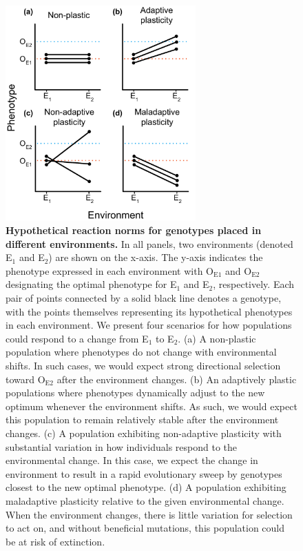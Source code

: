 \begin{figure}[ht!]
    \centering
    \includegraphics[width=0.65\textwidth]{media/reaction-norms.pdf}
    \caption{\small
    \textbf{Hypothetical reaction norms for genotypes placed in different environments.}
    In all panels, two environments (denoted E$_1$ and E$_2$) are shown on the x-axis.
    The y-axis indicates the phenotype expressed in each environment with O$_{\text{E}1}$ and O$_{\text{E}2}$ designating the optimal phenotype for E$_1$ and E$_2$, respectively.
    Each pair of points connected by a solid black line denotes a genotype, with the points themselves representing its hypothetical phenotypes in each environment.
    We present four scenarios for how populations could respond to a change from E$_1$ to E$_2$.
    (a) A non-plastic population where phenotypes do not change with environmental shifts.  In such cases, we would expect strong directional selection toward O$_{\text{E}2}$ after the environment changes.
    (b) An adaptively plastic populations where phenotypes dynamically adjust to the new optimum whenever the environment shifts. As such, we would expect this population to remain relatively stable after the environment changes.
    (c) A population exhibiting non-adaptive plasticity with substantial variation in how individuals respond to the environmental change. In this case, we expect the change in environment to result in a rapid evolutionary sweep by genotypes closest to the new optimal phenotype.
    (d) A population exhibiting maladaptive plasticity relative to the given environmental change. When the environment changes, there is little variation for selection to act on, and without beneficial mutations, this population could be at risk of extinction. 
    }
    \label{fig:reaction-norms}
\end{figure}

